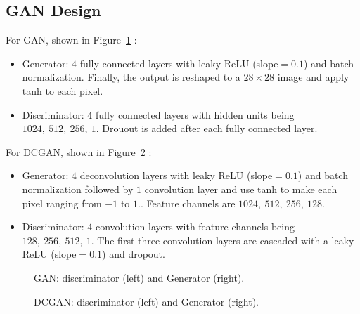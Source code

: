 \documentclass[runningheads]{llncs}
\begin{document}
\subsection{GAN Design}
For GAN, shown in Figure~\ref{fig1} :
\begin{itemize}
	\item Generator: $4$ fully connected layers with leaky ReLU (slope$=0.1$) and batch normalization. Finally, the output is reshaped to a $28\times 28$ image and apply tanh to each pixel.
	\item Discriminator: $4$ fully connected layers with hidden units being $1024,\ 512,\ 256,\ 1$. Drouout is added after each fully connected layer.
\end{itemize}
For DCGAN, shown in Figure~\ref{fig2} :
\begin{itemize}
	\item Generator: $4$ deconvolution layers with leaky ReLU (slope$=0.1$) and batch normalization followed by $1$ convolution layer and use tanh to make each pixel ranging from $-1$ to $1$.. Feature channels are $1024,\ 512,\ 256,\ 128$. 
	\item Discriminator: $4$ convolution layers with feature channels being $128,\ 256,\ 512,\ 1$. The first three convolution layers are cascaded with a leaky ReLU (slope$=0.1$) and dropout.
\end{itemize}
\begin{figure}[ht]
	\centering
	\setlength{\fboxrule}{0.0pt}
	\caption{GAN: discriminator (left) and Generator (right).}
	\label{fig1}
\end{figure}
\begin{figure}[ht]
	\centering
	\setlength{\fboxrule}{0.0pt}
	\caption{DCGAN: discriminator (left) and Generator (right).}
	\label{fig2}
\end{figure}
\end{document}
